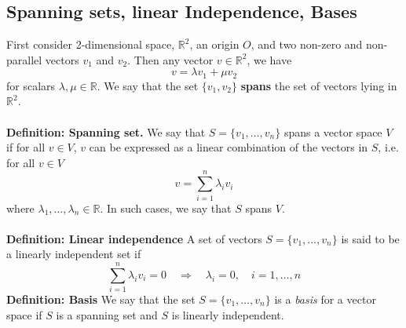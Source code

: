 \documentclass[12pt]{article}
\begin{document}
\subsection*{Spanning sets, linear Independence, Bases}
First consider 2-dimensional space, $\mathbb{R}^2$, an origin $O$, and two non-zero and non-parallel vectors $v_{1}$ and $v_{2}$. Then any vector $v\in\mathbb{R}^2$, we have
\begin{equation}
    v = \lambda v_{1} + \mu v_{2}
\end{equation}
for scalars $\lambda, \mu\in\mathbb{R}$. We say that the set $\{v_{1}, v_{2}\}$ \textbf{spans} the set of vectors lying in $\mathbb{R}^2$.\\\\
\textbf{Definition: Spanning set.} We say that $S = \{v_{1}, \dots, v_{n}\}$ spans a vector space $V$ if for all $v\in V$, $v$ can be expressed as a linear combination of the vectors in $S$, i.e. for all $v\in V$
\begin{equation}
    v = \sum_{i=1}^{n}\lambda_{i}v_{i}
\end{equation}
where $\lambda_{1}, \dots, \lambda_{n}\in\mathbb{R}$. In such cases, we say that $S$ spans $V$.\\\\
\textbf{Definition: Linear independence} A set of vectors $S = \{v_{1}, \dots, v_{n}\}$ is said to be a linearly independent set if
\begin{equation}
    \sum_{i=1}^{n}\lambda_{i}v_{i} = 0 \quad \Rightarrow \quad \lambda_{i} = 0, \quad i = 1, \dots, n
\end{equation}
\textbf{Definition: Basis} We say that the set $S = \{v_{1}, \dots, v_{n}\}$ is a \textit{basis} for a vector space if $S$ is a spanning set and $S$ is linearly independent.
\end{document}
